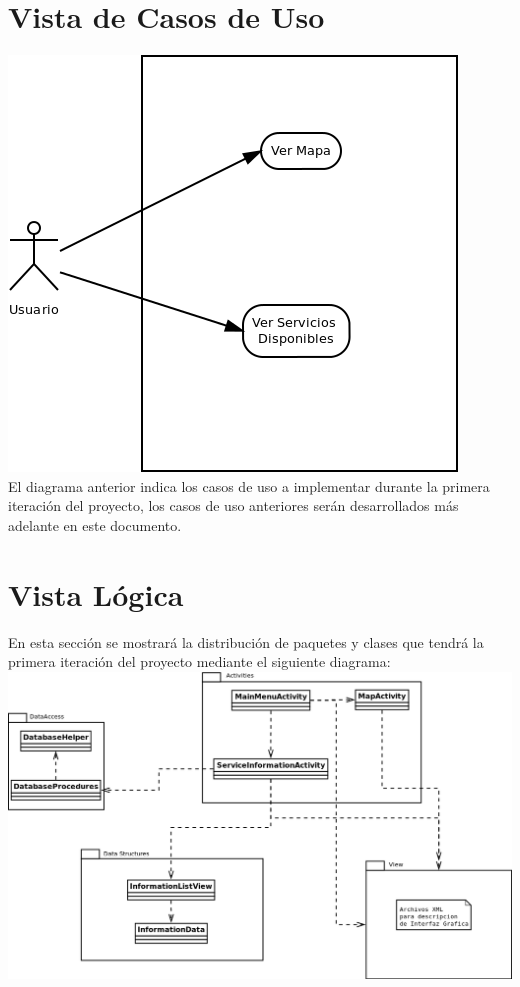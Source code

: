 \documentclass[12pt]{article}
\begin{document}
\section{Vista de Casos de Uso}
\includegraphics[width=\linewidth]{"../Documentos/Diagramas/casos de uso"}\\
	
El diagrama anterior indica los casos de uso a implementar durante la primera iteraci\'on del proyecto, los casos de uso anteriores ser\'an desarrollados m\'as adelante en este documento.
	


\section{Vista L\'ogica}
En esta secci\'on se mostrar\'a la distribuci\'on de paquetes y clases que tendr\'a la primera iteraci\'on del proyecto mediante el siguiente diagrama:\\

\includegraphics[width=\linewidth]{"../Documentos/Diagramas/Logical"}
\end{document}
